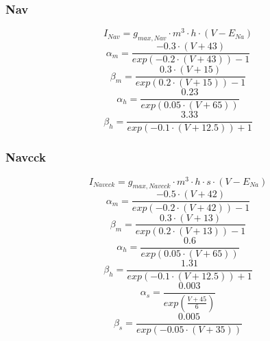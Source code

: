 \documentclass[12pt]{article}
\begin{document}
\subsubsection{Nav}
\begin{equation}
I_{Nav} = g_{max, Nav} \cdot m^3 \cdot h \cdot (V - E_{Na})
\end{equation}
\begin{equation}
\alpha_m = \frac{-0.3 \cdot (V + 43)}{exp(-0.2\cdot(V+43)) - 1}
\end{equation}
\begin{equation}
\beta_m = \frac{0.3 \cdot (V + 15)}{exp(0.2\cdot(V+15)) - 1}
\end{equation}
\begin{equation}
\alpha_h = \frac{0.23}{exp(0.05\cdot(V+65))}
\end{equation}
\begin{equation}
\beta_h = \frac{3.33}{exp(-0.1\cdot(V+12.5)) + 1}
\end{equation}


\subsubsection{Navcck}
\begin{equation}
I_{Navcck} = g_{max, Navcck} \cdot m^3 \cdot h \cdot s \cdot (V - E_{Na})
\end{equation}
\begin{equation}
\alpha_m = \frac{-0.5 \cdot (V + 42)}{exp(-0.2\cdot(V+42)) - 1}
\end{equation}
\begin{equation}
\beta_m = \frac{0.3 \cdot (V + 13)}{exp(0.2\cdot(V+13)) - 1}
\end{equation}
\begin{equation}
\alpha_h = \frac{0.6}{exp(0.05\cdot(V+65))}
\end{equation}
\begin{equation}
\beta_h = \frac{1.31}{exp(-0.1\cdot(V+12.5)) + 1}
\end{equation}
\begin{equation}
\alpha_s = \frac{0.003}{exp( \frac{V+45}{6})}
\end{equation}
\begin{equation}
\beta_s = \frac{0.005}{exp(-0.05\cdot(V+35))}
\end{equation}
\end{document}

